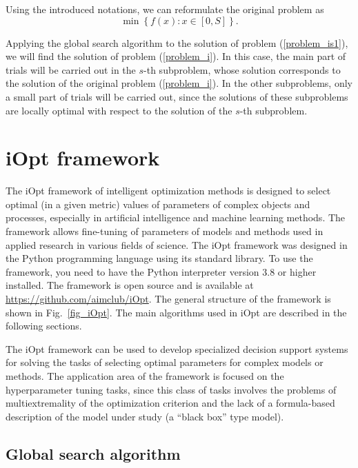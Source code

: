 \documentclass[iicol]{sn-jnl}
\theoremstyle{thmstyleone}%
\theoremstyle{thmstyletwo}%
\theoremstyle{thmstylethree}%
\begin{document}
Using the introduced notations, we can reformulate the original problem as
\begin{equation}\label{problem_is1}
\min \left\{f(x): x \in [0,S] \right\}.
\end{equation}

Applying the global search algorithm to the solution of problem (\ref{problem_is1}), we will find the solution of problem (\ref{problem_i}). In this case, the main part of trials will be carried out in the $s$-th subproblem, whose solution corresponds to the solution of the original problem (\ref{problem_i}). In the other subproblems, only a small part of trials will be carried out, since the solutions of these subproblems are locally optimal with respect to the solution of the $s$-th subproblem.

\section{iOpt framework}\label{sec_iOpt}

The iOpt framework of intelligent optimization methods is designed to select optimal (in a given metric) values of parameters of complex objects and processes, especially in artificial intelligence and machine learning methods. The framework allows fine-tuning of parameters of models and methods used in applied research in various fields of science.  The iOpt framework was designed in the Python programming language using its standard library. To use the framework, you need to have the Python interpreter version 3.8 or higher installed. The framework is open source and is available at \url{https://github.com/aimclub/iOpt}.
The general structure of the framework is shown in Fig.~\ref{fig_iOpt}. The main algorithms used in iOpt are described in the following sections.

The iOpt framework can be used to develop specialized decision support systems for solving the tasks of selecting optimal parameters for complex models or methods. The application area of the framework is focused on the hyperparameter tuning tasks, since this class of tasks involves the problems of multiextremality of the optimization criterion and the lack of a formula-based description of the model under study (a ``black box'' type model).

\subsection{Global search algorithm}\label{sec_GSA}
\end{document}
